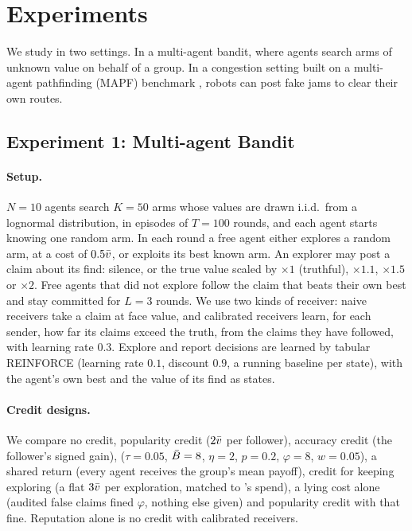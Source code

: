 \section{Experiments}
\label{sec:experiments}

We study \tvc{} in two settings. In a multi-agent bandit, where agents search arms of unknown value on behalf of a group. In a congestion setting built on a multi-agent pathfinding (MAPF) benchmark \citep{skrynnik2025pogema}, robots can post fake jams to clear their own routes. 

\subsection{Experiment 1: Multi-agent Bandit} \label{subsec:experiment1}

\paragraph{Setup.}
$N=10$ agents search $K=50$ arms whose values are drawn i.i.d.\ from a lognormal distribution, in episodes of $T=100$ rounds, and each agent starts knowing one random arm. In each round a free agent either explores a random arm, at a cost of $0.5\bar v$, or exploits its best known arm. An explorer may post a claim about its find: silence, or the true value scaled by $\times1$ (truthful), $\times1.1$, $\times1.5$ or $\times2$. Free agents that did not explore follow the claim that beats their own best and stay committed for $L=3$ rounds. We use two kinds of receiver: naive receivers take a claim at face value, and calibrated receivers learn, for each sender, how far its claims exceed the truth, from the claims they have followed, with learning rate $0.3$. Explore and report decisions are learned by tabular REINFORCE (learning rate $0.1$, discount $0.9$, a running baseline per state), with the agent's own best and the value of its find as states.

\paragraph{Credit designs.}
We compare no credit, popularity credit ($2\bar v$ per follower), accuracy credit (the follower's signed gain), \tvc{} ($\tau=0.05$, $\bar B=8$, $\eta=2$, $p=0.2$, $\varphi=8$, $w=0.05$), a shared return (every agent receives the group's mean payoff), credit for keeping exploring (a flat $3\bar v$ per exploration, matched to \tvc{}'s spend), a lying cost alone (audited false claims fined $\varphi$, nothing else given) and popularity credit with that fine. Reputation alone is no credit with calibrated receivers.

